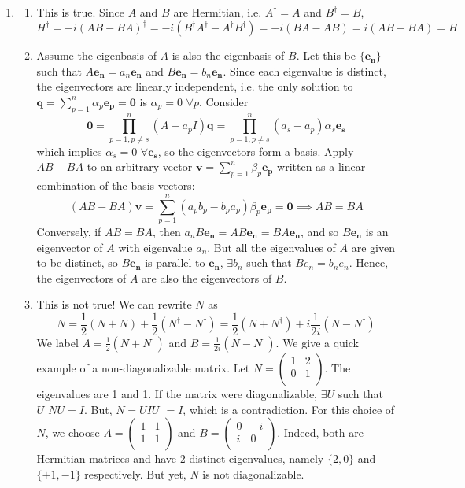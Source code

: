 \documentclass[a4paper]{article}
\begin{document}
\begin{ans}\leavevmode
\begin{enumerate}[label=(\alph*)]
\item 
\begin{enumerate}[label=(\roman*)]
\item This is true. Since $A$ and $B$ are Hermitian, i.e. $A^\dag=A$ and $B^\dag=B$, 
$$H^\dag=-i(AB-BA)^\dag=-i(B^\dag A^\dag-A^\dag B^\dag)=-i(BA-AB)=i(AB-BA)=H$$
\item Assume the eigenbasis of $A$ is also the eigenbasis of $B$. Let this be $\{\mathbf{e_n}\}$ such that $A\mathbf{e_n}=a_n\mathbf{e_n}$ and $B\mathbf{e_n}=b_n\mathbf{e_n}$. Since each eigenvalue is distinct, the eigenvectors are linearly independent, i.e. the only solution to $\mathbf{q}=\sum_{p=1}^n\alpha_p\mathbf{e_p}=\boldsymbol{0}$ is $\alpha_p=0$ $\forall p$. Consider
$$\boldsymbol{0}=\prod_{p=1,p\neq s}^n(A-a_pI)\mathbf{q}=\prod_{p=1,p\neq s}^n(a_s-a_p)\alpha_s\mathbf{e_s}$$
which implies $\alpha_s=0$ $\forall\mathbf{e_s}$, so the eigenvectors form a basis. Apply $AB-BA$ to an arbitrary vector $\mathbf{v}=\sum_{p=1}^n\beta_p\mathbf{e_p}$ written as a linear combination of the basis vectors:
$$(AB-BA)\mathbf{v}=\sum_{p=1}^n(a_pb_p-b_pa_p)\beta_p\mathbf{e_p}=\boldsymbol{0}\implies AB=BA$$
Conversely, if $AB=BA$, then $a_nB\mathbf{e_n}=AB\mathbf{e_n}=BA\mathbf{e_n}$, and so $B\mathbf{e_n}$ is an eigenvector of $A$ with eigenvalue $a_n$. But all the eigenvalues of $A$ are given to be distinct, so $B\mathbf{e_n}$ is parallel to $\mathbf{e_n}$, $\exists b_n$ such that $Be_n=b_ne_n$. Hence, the eigenvectors of $A$ are also the eigenvectors of $B$.
\item This is not true! We can rewrite $N$ as
$$N=\frac{1}{2}(N+N)+\frac{1}{2}(N^\dag-N^\dag)=\frac{1}{2}(N+N^\dag)+i\frac{1}{2i}(N-N^\dag)$$
We label $A=\frac{1}{2}(N+N^\dag)$ and $B=\frac{1}{2i}(N-N^\dag)$. We give a quick example of a non-diagonalizable matrix. Let $N=\begin{pmatrix}1&2\\0&1\\\end{pmatrix}$. The eigenvalues are 1 and 1. If the matrix were diagonalizable, $\exists U$ such that $U^\dag NU=I$. But, $N=UIU^\dag=I$, which is a contradiction. For this choice of $N$, we choose $A=\begin{pmatrix}1&1\\1&1\\\end{pmatrix}$ and $B=\begin{pmatrix}0&-i\\i&0\\\end{pmatrix}$. Indeed, both are Hermitian matrices and have 2 distinct eigenvalues, namely $\{2,0\}$ and $\{+1,-1\}$ respectively. But yet, $N$ is not diagonalizable.

\end{enumerate}
\end{enumerate}
\end{ans}
\end{document}

